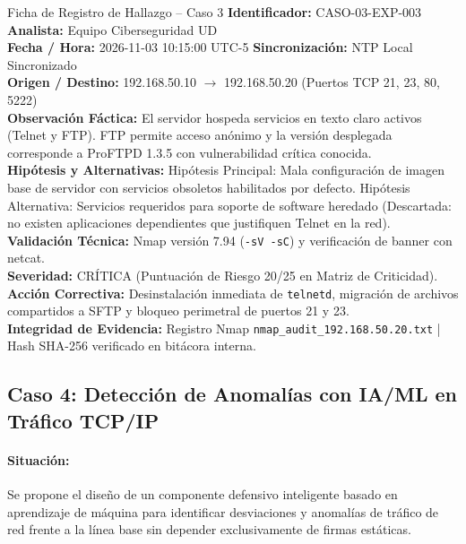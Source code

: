 \documentclass[11pt,letterpaper]{article}
\begin{document}
\begin{hallazgobox}{Ficha de Registro de Hallazgo -- Caso 3}
    \textbf{Identificador:} CASO-03-EXP-003 \hfill \textbf{Analista:} Equipo Ciberseguridad UD\\
    \textbf{Fecha / Hora:} 2026-11-03 10:15:00 UTC-5 \hfill \textbf{Sincronización:} NTP Local Sincronizado\\
    \textbf{Origen / Destino:} 192.168.50.10 $\rightarrow$ 192.168.50.20 (Puertos TCP 21, 23, 80, 5222)\\
    \textbf{Observación Fáctica:} El servidor hospeda servicios en texto claro activos (Telnet y FTP). FTP permite acceso anónimo y la versión desplegada corresponde a ProFTPD 1.3.5 con vulnerabilidad crítica conocida.\\
    \textbf{Hipótesis y Alternativas:} Hipótesis Principal: Mala configuración de imagen base de servidor con servicios obsoletos habilitados por defecto. Hipótesis Alternativa: Servicios requeridos para soporte de software heredado (Descartada: no existen aplicaciones dependientes que justifiquen Telnet en la red).\\
    \textbf{Validación Técnica:} Nmap versión 7.94 (\texttt{-sV -sC}) y verificación de banner con netcat.\\
    \textbf{Severidad:} CRÍTICA (Puntuación de Riesgo 20/25 en Matriz de Criticidad).\\
    \textbf{Acción Correctiva:} Desinstalación inmediata de \texttt{telnetd}, migración de archivos compartidos a SFTP y bloqueo perimetral de puertos 21 y 23.\\
    \textbf{Integridad de Evidencia:} Registro Nmap \texttt{nmap\_audit\_192.168.50.20.txt} | Hash SHA-256 verificado en bitácora interna.
\end{hallazgobox}

\newpage
\subsection{Caso 4: Detección de Anomalías con IA/ML en Tráfico TCP/IP}

\paragraph{Situación:} Se propone el diseño de un componente defensivo inteligente basado en aprendizaje de máquina para identificar desviaciones y anomalías de tráfico de red frente a la línea base sin depender exclusivamente de firmas estáticas.
\end{document}
